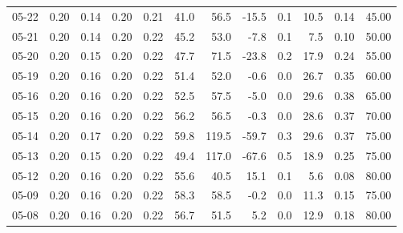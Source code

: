 \begin{threeparttable}
{\begin{tabular}{lrrrrrrrrrrr}
  05-22 &          0.20 &          0.14 &          0.20 &        0.21 &                41.0 &                56.5 &      -15.5 &                 0.1 &             10.5 &            0.14 &                  45.00 \\
  05-21 &          0.20 &          0.14 &          0.20 &        0.22 &                45.2 &                53.0 &       -7.8 &                 0.1 &              7.5 &            0.10 &                  50.00 \\
  05-20 &          0.20 &          0.15 &          0.20 &        0.22 &                47.7 &                71.5 &      -23.8 &                 0.2 &             17.9 &            0.24 &                  55.00 \\
  05-19 &          0.20 &          0.16 &          0.20 &        0.22 &                51.4 &                52.0 &       -0.6 &                 0.0 &             26.7 &            0.35 &                  60.00 \\
  05-16 &          0.20 &          0.16 &          0.20 &        0.22 &                52.5 &                57.5 &       -5.0 &                 0.0 &             29.6 &            0.38 &                  65.00 \\
  05-15 &          0.20 &          0.16 &          0.20 &        0.22 &                56.2 &                56.5 &       -0.3 &                 0.0 &             28.6 &            0.37 &                  70.00 \\
  05-14 &          0.20 &          0.17 &          0.20 &        0.22 &                59.8 &               119.5 &      -59.7 &                 0.3 &             29.6 &            0.37 &                  75.00 \\
  05-13 &          0.20 &          0.15 &          0.20 &        0.22 &                49.4 &               117.0 &      -67.6 &                 0.5 &             18.9 &            0.25 &                  75.00 \\
  05-12 &          0.20 &          0.16 &          0.20 &        0.22 &                55.6 &                40.5 &       15.1 &                 0.1 &              5.6 &            0.08 &                  80.00 \\
  05-09 &          0.20 &          0.16 &          0.20 &        0.22 &                58.3 &                58.5 &       -0.2 &                 0.0 &             11.3 &            0.15 &                  75.00 \\
  05-08 &          0.20 &          0.16 &          0.20 &        0.22 &                56.7 &                51.5 &        5.2 &                 0.0 &             12.9 &            0.18 &                  80.00 \\

\end{tabular}}
\end{threeparttable}
